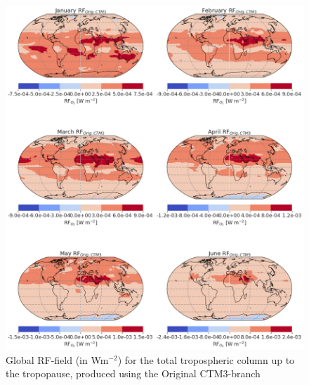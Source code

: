 \begin{figure}[ht]
    \centering
    \includegraphics[width = \linewidth]{Chapter6_Results/images/RF/Orig_RF_global.png}
    \caption{Global RF-field (in Wm$^{-2}$) for the total tropospheric column up to the tropopause, produced using the Original CTM3-branch}
    \label{fig:origRF_global_2001}
\end{figure}